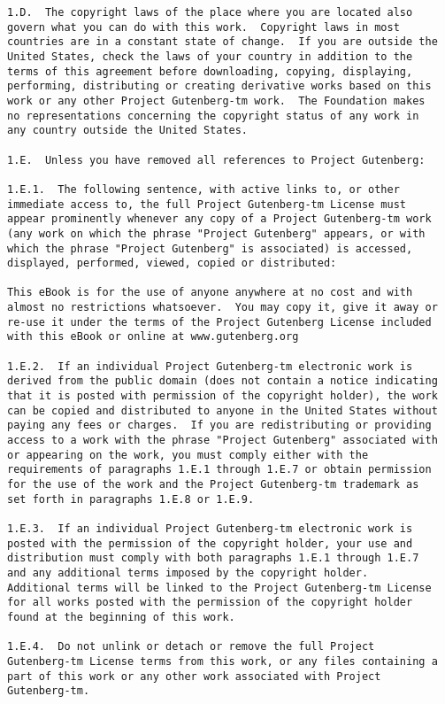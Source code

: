 \documentclass[letterpaper,12pt,oneside,openany]{memoir}
\begin{document}
\begin{verbatim}
1.D.  The copyright laws of the place where you are located also
govern what you can do with this work.  Copyright laws in most
countries are in a constant state of change.  If you are outside the
United States, check the laws of your country in addition to the
terms of this agreement before downloading, copying, displaying,
performing, distributing or creating derivative works based on this
work or any other Project Gutenberg-tm work.  The Foundation makes
no representations concerning the copyright status of any work in
any country outside the United States.

1.E.  Unless you have removed all references to Project Gutenberg:

1.E.1.  The following sentence, with active links to, or other
immediate access to, the full Project Gutenberg-tm License must
appear prominently whenever any copy of a Project Gutenberg-tm work
(any work on which the phrase "Project Gutenberg" appears, or with
which the phrase "Project Gutenberg" is associated) is accessed,
displayed, performed, viewed, copied or distributed:

This eBook is for the use of anyone anywhere at no cost and with
almost no restrictions whatsoever.  You may copy it, give it away or
re-use it under the terms of the Project Gutenberg License included
with this eBook or online at www.gutenberg.org

1.E.2.  If an individual Project Gutenberg-tm electronic work is
derived from the public domain (does not contain a notice indicating
that it is posted with permission of the copyright holder), the work
can be copied and distributed to anyone in the United States without
paying any fees or charges.  If you are redistributing or providing
access to a work with the phrase "Project Gutenberg" associated with
or appearing on the work, you must comply either with the
requirements of paragraphs 1.E.1 through 1.E.7 or obtain permission
for the use of the work and the Project Gutenberg-tm trademark as
set forth in paragraphs 1.E.8 or 1.E.9.

1.E.3.  If an individual Project Gutenberg-tm electronic work is
posted with the permission of the copyright holder, your use and
distribution must comply with both paragraphs 1.E.1 through 1.E.7
and any additional terms imposed by the copyright holder.
Additional terms will be linked to the Project Gutenberg-tm License
for all works posted with the permission of the copyright holder
found at the beginning of this work.

1.E.4.  Do not unlink or detach or remove the full Project
Gutenberg-tm License terms from this work, or any files containing a
part of this work or any other work associated with Project
Gutenberg-tm.


\end{verbatim}
\end{document}
